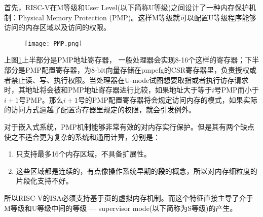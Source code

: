 \begin{enumerate}
	首先，RISC-V在M等级和User Level(以下简称U等级)之间设计了一种内存保护机制：Physical Memory Protection (PMP)。这样M等级就可以配置U等级程序能够访问的内存区域以及访问的权限。
	\begin{figure}[!htbp]
		\centering
		\texttt{[image: PMP.png]}
		\label{fig:pmp}
	\end{figure}
	上图\ref{fig:pmp}上半部分是PMP地址寄存器， 一般处理器会实现8-16个这样的寄存器；下半部分是PMP配置寄存器，为8-bit向量存储在pmpcfg的CSR寄存器里，负责授权或者禁止读、写、执行权限。当处理器在U-mode试图想要取指或者执行访存请求时，其地址将会被和PMP地址寄存器进行比较，如果地址大于等于$ i $号PMP而小于$ i+1 $号PMP。那么$ i+1 $号的PMP配置寄存器将会规定访问内存的模式，如果实际的访问方式逾越了配置寄存器里规定的权限，就会引发例外\citep{Patterson:2017:RRO:3202479}。
	
	对于嵌入式系统，PMP机制能够非常有效的对内存实行保护。但是其有两个缺点使之不适合更为复杂的系统和通用计算，分别是：
	\begin{enumerate}[label=(\alph*)]
		\item 只支持最多16个内存区域，不具备扩展性。
		\item 这些区域都是连续的，有点像操作系统早期的\textbf{段}的概念，所以对内存细粒度的片段化支持不好。
	\end{enumerate}
	
	所以RISC-V的ISA必须支持基于页的虚拟内存机制。而这个特征直接主导了介于M等级和U等级中间的等级 --- supervisor mode(以下简称为S等级)的产生。
	

\end{enumerate}
